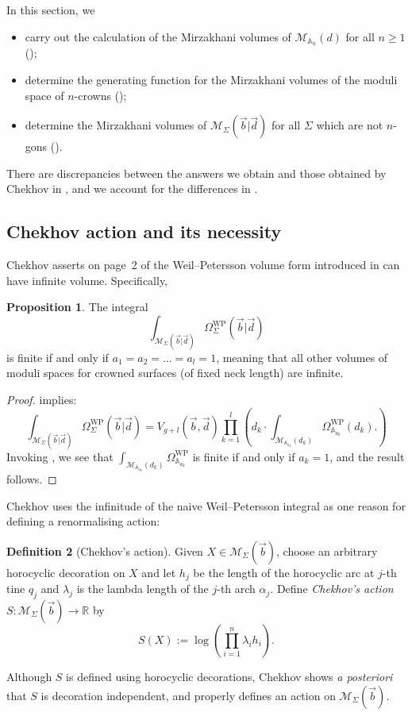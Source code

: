 \documentclass{amsart}
\theoremstyle{definition}
\newtheorem{proposition}{Proposition}[section]
\newtheorem{definition}[proposition]{Definition}
\begin{document}
In this section, we
\begin{itemize}
    \item carry out the calculation of the Mirzakhani volumes of $\mathcal{M}_{\mathbb{A}_n}(d)$ for all $n\geqslant1$ ();
    \item determine the generating function for the Mirzakhani volumes of the moduli space of $n$-crowns ();
    \item determine the Mirzakhani volumes of $\mathcal{M}_{\Sigma}(\vec{b}|\vec{d})$ for all $\Sigma$ which are not $n$-gons ().
\end{itemize}  
There are discrepancies between the answers we obtain and those obtained by Chekhov in \cite{chekhov2024}, and we account for the differences in .


\subsection{Chekhov action and its necessity}

Chekhov asserts on page~2 of \cite{chekhov2024} the Weil--Petersson volume form introduced in  can have infinite volume. Specifically,

\begin{proposition}

The integral 
\[
\int_{\mathcal{M}_{\Sigma}(\vec{b}|\vec{d})}
\Omega^{\mathrm{WP}}_{\Sigma}(\vec{b}|\vec{d})
\]
is finite if and only if $a_1=a_2=\ldots=a_l=1$, meaning that all other volumes of moduli spaces for crowned surfaces (of fixed neck length) are infinite.   
\end{proposition}

\begin{proof}
     implies:
    \[
    \int_{\mathcal{M}_{\Sigma}(\vec{b}|\vec{d})}
    \Omega^{\mathrm{WP}}_{\Sigma}(\vec{b}|\vec{d})
    =
    V_{g+l}(\vec{b},\vec{d})
    \prod_{k=1}^l
    \left(
    d_k\cdot\int_{\mathcal{M}_{\mathbb{A}_{a_k}}(d_k)}\Omega^{\mathrm{WP}}_{\mathbb{A}_{a_k}}(d_k).
    \right)
    \]
Invoking , we see that $\int_{\mathcal{M}_{\mathbb{A}_{a_k}}(d_k)}\Omega^{\mathrm{WP}}_{\mathbb{A}_{a_k}}$ is finite if and only if $a_k=1$, and the result follows.
\end{proof}

Chekhov uses the infinitude of the naive Weil--Petersson integral as one reason for defining a renormalising action: 
\begin{definition}[Chekhov's action]
Given $X\in\mathcal{M}_{\Sigma}(\vec{b})$, choose an arbitrary horocyclic decoration on $X$ and let $h_j$ be the length of the horocyclic arc at $j$-th tine $q_j$ and $\lambda_j$ is the lambda length of the $j$-th arch $\alpha_j$. Define \emph{Chekhov's action} $S:\mathcal{M}_{\Sigma}(\vec{b})\rightarrow\mathbb{R}$ by
\[
S(X) := \log \left(\prod_{i=1}^n \lambda_{i}h_i \right).
\]
\end{definition}
Although $S$ is defined using horocyclic decorations, Chekhov shows \textit{a posteriori} that $S$ is decoration independent, and properly defines an action on $\mathcal{M}_{\Sigma}(\vec{b})$.
\end{document}
